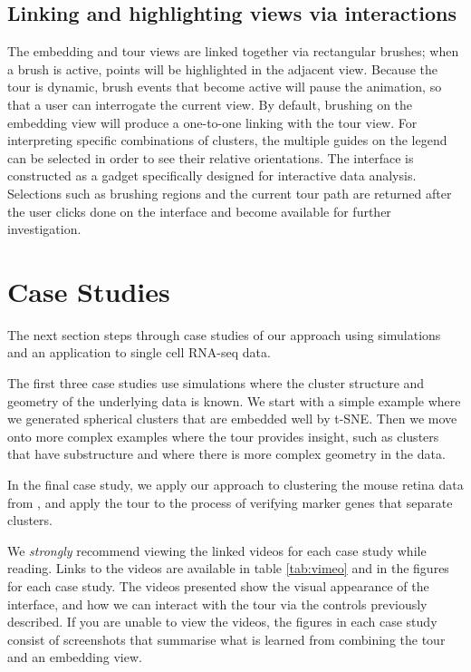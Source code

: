 \documentclass[article,notitle]{jdssv}
\begin{document}
\hypertarget{linking-and-highlighting-views-via-interactions}{%
\subsection{Linking and highlighting views via interactions}\label{linking-and-highlighting-views-via-interactions}}

The embedding and tour views are linked together via rectangular brushes;
when a brush is active, points will be highlighted in the adjacent view.
Because the tour is dynamic, brush events that become active will pause the
animation, so that a user can interrogate the current view. By default,
brushing on the embedding view will produce a one-to-one linking with the tour
view. For interpreting specific combinations of clusters, the multiple
guides on the legend can be selected in order to see their relative orientations.
The interface is constructed as a  gadget specifically designed for
interactive data analysis. Selections such as brushing regions and the current
tour path are returned after the user clicks done on the interface and become
available for further investigation.

\hypertarget{case-studies}{%
\section{Case Studies}\label{case-studies}}

The next section steps through case studies of our approach using simulations
and an application to single cell RNA-seq data.

The first three case studies use simulations where the cluster structure and
geometry of the underlying data is known. We start with a simple example
where we generated spherical clusters that are embedded well by t-SNE. Then
we move onto more complex examples where the tour provides insight, such
as clusters that have substructure and where there is more complex geometry
in the data.

In the final case study, we apply our approach to clustering
the mouse retina data from \citet{Macosko2015-ot}, and apply the tour
to the process of verifying marker genes that separate clusters.

We \emph{strongly} recommend viewing the linked videos for each case study
while reading. Links to the videos are available in table \ref{tab:vimeo}
and in the figures for each case study. The videos presented show the visual
appearance of the  interface, and how we can interact with the tour
via the controls previously described. If you are unable to view the videos,
the figures in each case study consist of screenshots that summarise what is
learned from combining the tour and an embedding view.
\end{document}
